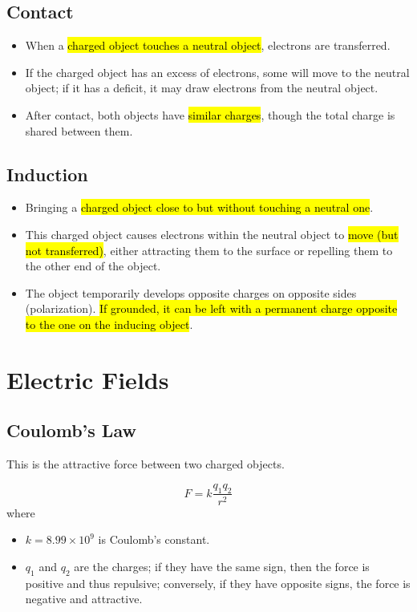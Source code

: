 \documentclass[a4paper,12pt]{article}
\let\oldsection\section
\renewcommand\section{\clearpage\oldsection}
\begin{document}
\subsection{Contact}

\begin{itemize}
  \item When a \hl{charged object touches a neutral object}, electrons are transferred.
  \item If the charged object has an excess of electrons, some will move to the neutral object; if it has a deficit, it may draw electrons from the neutral object.
  \item After contact, both objects have \hl{similar charges}, though the total charge is shared between them.
\end{itemize}

\subsection{Induction}
\begin{itemize}
  \item Bringing a \hl{charged object close to but without touching a neutral one}.
  \item This charged object causes electrons within the neutral object to \hl{move (but not transferred)}, either attracting them to the surface or repelling them to the other end of the object.
  \item The object temporarily develops opposite charges on opposite sides (polarization). \hl{If grounded, it can be left with a permanent charge opposite to the one on the inducing object}.
\end{itemize}

\section{Electric Fields}

\subsection{Coulomb's Law}

This is the attractive force between two charged objects.

\begin{equation}\label{eq:coulomb}
  F = k\frac{q_1q_2}{r^2}
\end{equation}
where
\begin{itemize}
  \item $k = 8.99 \times 10^9$ is Coulomb's constant.
  \item $q_1$ and $q_2$ are the charges; if they have the same sign, then the force is positive and thus repulsive; conversely, if they have opposite signs, the force is negative and attractive.
\end{itemize}
\end{document}
